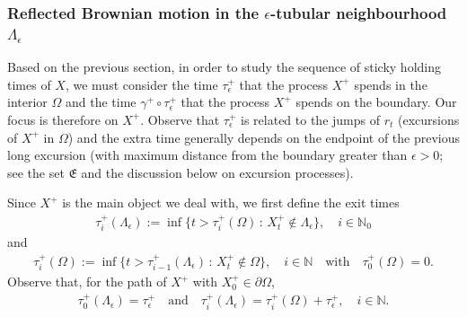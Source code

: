 \documentclass[11pt,a4paper]{article}
\newcommand{\magenta}{black}
\begin{document}
\subsubsection{Reflected Brownian motion in the $\epsilon$-tubular neighbourhood $\Lambda_\epsilon$}

{\color{\magenta} Based on the previous section, in order to study the sequence of sticky holding times of $X$, we must consider the time $\tau^+_\epsilon$ that the process $X^+$ spends in the interior $\Omega$ and the time $\gamma^+ \circ \tau^+_\epsilon$ that the process $X^+$ spends on the boundary. Our focus is therefore on $X^+$. Observe that $\tau^+_\epsilon$ is related to the jumps of $r_t$ (excursions of $X^+$ in $\Omega$) and the extra time generally depends on the endpoint of the previous long excursion (with maximum distance from the boundary  greater than $\epsilon>0$; see the set $\mathfrak{E}$ and the discussion below on excursion processes). 

Since $X^+$ is the main object we deal with, we first define the exit times
\begin{align*}
\tau^+_i(\Lambda_\epsilon) := \inf\{t > \tau^+_i(\Omega)\, :\, X^+_t \notin  \Lambda_\epsilon \}, \quad i \in \mathbb{N}_0
\end{align*} 
and 
\begin{align*}
\tau^+_i (\Omega) := \inf\{t > \tau^+_{i-1}(\Lambda_\epsilon)\, :\, X^+_t \notin  \Omega \}, \quad i \in \mathbb{N} \quad \textrm{with} \quad \tau^+_0(\Omega)=0.
\end{align*}
Observe that, for the path of $X^+$ with $X^+_0 \in \partial \Omega$, 
\begin{align*}
\tau^+_0(\Lambda_\epsilon) = \tau^+_\epsilon \quad \textrm{and} \quad \tau^+_i(\Lambda_\epsilon) = \tau^+_i(\Omega) + \tau^+_\epsilon, \quad i \in \mathbb{N}.
\end{align*}

}
\end{document}
